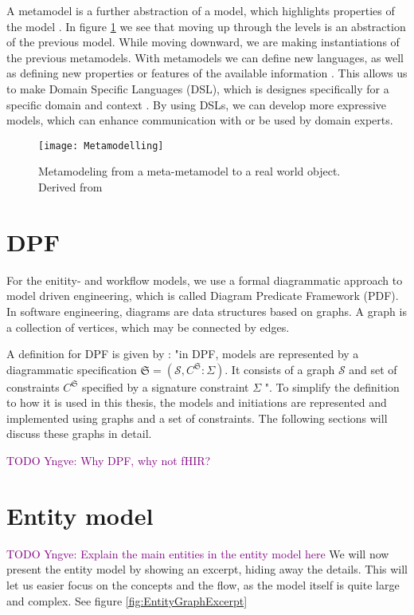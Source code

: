 A metamodel is a further abstraction of a model, which highlights properties of the model \parencite{Brambilla2017}. In figure \ref{fig:Metamodelling} we see that moving up through the levels is an abstraction of the previous model. While moving downward, we are making instantiations of the previous metamodels. With metamodels we can define new languages, as well as defining new properties or features of the available information \parencite{Brambilla2017}. This allows us to make Domain Specific Languages (DSL), which is designes specifically for a specific domain and context \parencite{Brambilla2017}\parencite{RodriguesdaSilva2015}. By using DSLs, we can develop more expressive models, which can enhance communication with or be used by domain experts. 

\begin{figure}[h!]
	\texttt{[image: Metamodelling]}
	\caption{Metamodeling from a meta-metamodel to a real world object. Derived from \parencite{Brambilla2017}}
	\label{fig:Metamodelling}
\end{figure}

\section{DPF}
For the enitity- and workflow models, we use a formal diagrammatic approach to model driven engineering, which is called Diagram Predicate Framework (PDF). In software engineering, diagrams are data structures based on graphs. A graph is a collection of vertices, which may be connected by edges.

A definition for DPF is given by \textcite{Rutle2010}: "in DPF, models are represented by a diagrammatic specification \(\mathfrak{S} = ({\mathcal{S}}, C^{\mathfrak{S}} : \Sigma)\). It consists of a graph \(\mathcal{S}\) and set of constraints \(C^{\mathfrak{S}}\) specified by a signature constraint $\Sigma$ ". To simplify the definition to how it is used in this thesis, the models and initiations are represented and implemented using graphs and a set of constraints. The following sections will discuss these graphs in detail.


\textcolor{purple}{TODO Yngve: Why DPF, why not fHIR?}
\section{Entity model}
\textcolor{purple}{TODO Yngve: Explain the main entities in the entity model here}
We will now present the entity model by showing an excerpt, hiding away the details. This will let us easier focus on the concepts and the flow, as the model itself is quite large and complex. See figure \ref{fig:EntityGraphExcerpt}

